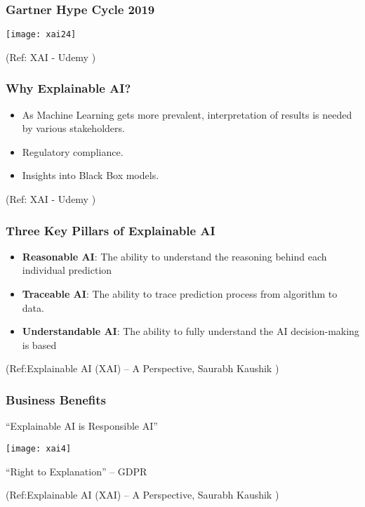 \begin{frame}[fragile]\frametitle{Gartner Hype Cycle 2019}

\begin{center}
\texttt{[image: xai24]}

\tiny{(Ref: XAI - Udemy  )}
\end{center}
\end{frame}


\begin{frame}[fragile]\frametitle{Why Explainable AI?}
\begin{itemize}
\item As Machine Learning gets more prevalent, interpretation of results is needed by various stakeholders.
\item Regulatory compliance.
\item Insights into Black Box models.
\end{itemize}

\tiny{(Ref: XAI - Udemy  )}

\end{frame}

\begin{frame}[fragile]\frametitle{Three Key Pillars of Explainable AI}
\begin{itemize}
\item {\bf Reasonable AI}: The ability to understand the reasoning behind each individual prediction
\item {\bf Traceable AI}: The ability to trace prediction process from algorithm to data. 
\item {\bf Understandable AI}: The ability to fully understand the AI decision-making is based

\end{itemize}

\tiny{(Ref:Explainable AI (XAI) – A Perspective, Saurabh Kaushik  )}

\end{frame}

\begin{frame}[fragile]\frametitle{Business Benefits}
“Explainable AI is Responsible AI”

\begin{center}
\texttt{[image: xai4]}
\end{center}

“Right to Explanation” – GDPR 

\tiny{(Ref:Explainable AI (XAI) – A Perspective, Saurabh Kaushik  )}

\end{frame}

